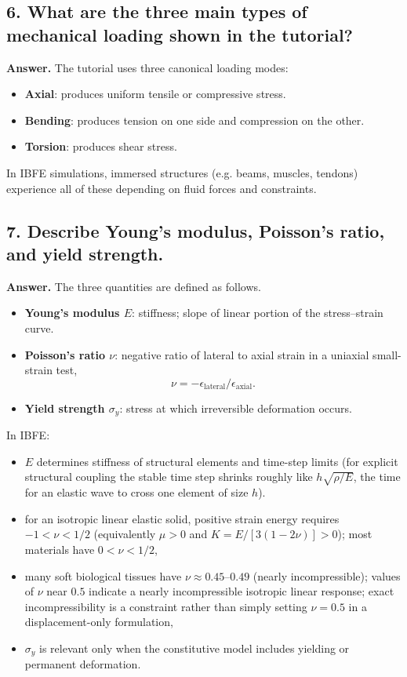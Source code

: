 \documentclass[12pt]{article}
\begin{document}
\subsection*{6. What are the three main types of mechanical loading shown in the tutorial?}

\textbf{Answer.}
The tutorial uses three canonical loading modes:

\begin{itemize}
    \item \textbf{Axial}: produces uniform tensile or compressive stress.
    \item \textbf{Bending}: produces tension on one side and compression on the other.
    \item \textbf{Torsion}: produces shear stress.
\end{itemize}

In IBFE simulations, immersed structures (e.g. beams, muscles, tendons)
experience all of these depending on fluid forces and constraints.


\subsection*{7. Describe Young’s modulus, Poisson’s ratio, and yield strength.}

\textbf{Answer.}
The three quantities are defined as follows.
\begin{itemize}
    \item \textbf{Young's modulus $E$}: stiffness; slope of linear portion of the stress–strain curve.
    \item \textbf{Poisson's ratio $\nu$}: negative ratio of lateral to axial strain in a uniaxial small-strain test,
    \[
    \nu = -\epsilon_{\text{lateral}}/\epsilon_{\text{axial}}.
    \]
    \item \textbf{Yield strength $\sigma_y$}: stress at which irreversible deformation occurs.
\end{itemize}

In IBFE:
\begin{itemize}
    \item $E$ determines stiffness of structural elements and time-step limits (for explicit structural coupling the stable time step shrinks roughly like $h\sqrt{\rho/E}$, the time for an elastic wave to cross one element of size $h$).
    \item for an isotropic linear elastic solid, positive strain energy requires $-1<\nu<1/2$ (equivalently $\mu>0$ and $K=E/[3(1-2\nu)]>0$); most materials have $0<\nu<1/2$,
    \item many soft biological tissues have $\nu \approx 0.45$--$0.49$ (nearly incompressible); values of $\nu$ near $0.5$ indicate a nearly incompressible isotropic linear response; exact incompressibility is a constraint rather than simply setting $\nu=0.5$ in a displacement-only formulation,
    \item $\sigma_y$ is relevant only when the constitutive model includes yielding or permanent deformation.
\end{itemize}
\end{document}
